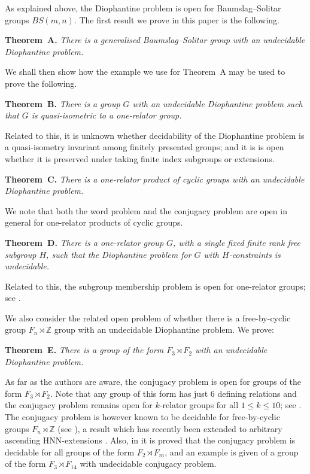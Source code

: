 \documentclass[11pt]{amsart}
\theoremstyle{definition}
\numberwithin{theorem}{section}
\newcommand{\Z}{\mathbb{Z}}
\begin{document}
As explained above, the Diophantine problem is open for Baumslag--Solitar groups $BS(m,n)$. The first result we prove in this paper is the following.  

\noindent \textbf{Theorem~A.} 
\emph{
There is a generalised Baumslag--Solitar group with an undecidable Diophantine problem.} 

We shall then show how the example we use for Theorem~A may be used to prove the following. 

\noindent \textbf{Theorem~B.} 
\emph{
There is a group $G$ with an undecidable Diophantine problem such that $G$ is quasi-isometric to a one-relator group.}

Related to this, it is unknown whether decidability of the Diophantine problem is a quasi-isometry invariant among finitely presented groups; and it is is open whether it is preserved under taking finite index subgroups or extensions.

\noindent \textbf{Theorem~C.} 
\emph{ There is a one-relator product of cyclic groups 
with an undecidable Diophantine problem. }

We note that both the word problem and the conjugacy problem are open in general for one-relator products of cyclic groups. 

\noindent \textbf{Theorem~D.} 
\emph{ 
There is a one-relator group $G$,  
with a single fixed finite rank free subgroup $H$, 
such that the Diophantine problem for $G$ with $H$-constraints is undecidable.} 

Related to this, the subgroup membership problem is open for one-relator groups;
see \cite[Problem 1.8.8]{CFMarcoOneRelatorSurvey}.

We also consider the related open problem of whether there is a free-by-cyclic group $F_n \rtimes \Z$ group with an undecidable Diophantine problem. We prove:  

\noindent \textbf{Theorem~E.} 
\emph{ 
There is a group of the form $F_3 \rtimes F_2$ with an undecidable Diophantine problem.} 

As far as the authors are aware, the conjugacy problem is open for groups of the form $F_3 \rtimes F_2$. Note that any group of this form has just 6 defining relations and the conjugacy problem remains open for $k$-relator groups for all $1 \leq k \leq 10$; see \cite[Section 1.8]{CFMarcoOneRelatorSurvey}. 
The conjugacy problem is however known to be decidable for free-by-cyclic groups $F_n \rtimes \Z$ (see \cite{Bogopolski2006}), a result which has recently been extended to arbitrary ascending HNN-extensions \cite{Logan}. 
Also, in 
\cite{BogopolskiMartinoVentura} 
it is proved that the conjugacy problem is decidable for all groups of the form $F_2 \rtimes F_m$, and an example is given of a group of the form $F_3 \rtimes F_{14}$ with undecidable conjugacy problem. 
\end{document}
